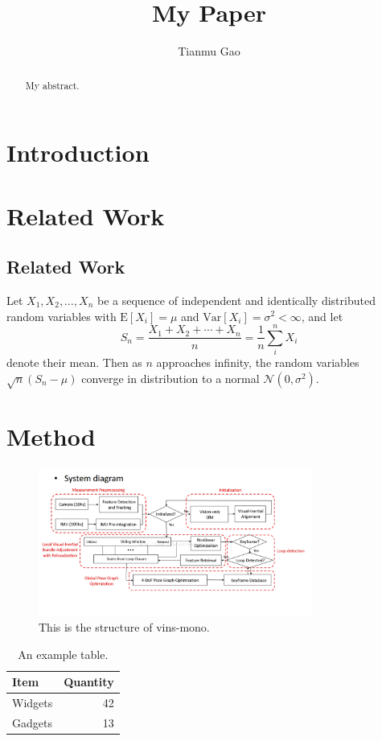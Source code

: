 \documentclass{article}
\title{My Paper}
\author{Tianmu Gao}
\begin{document}
\maketitle

\begin{abstract}
My abstract.
\end{abstract}

\section{Introduction}


\section{Related Work}
\subsection{Related Work}
Let $X_1, X_2, \ldots, X_n$ be a sequence of independent and identically distributed random variables with $\text{E}[X_i] = \mu$ and $\text{Var}[X_i] = \sigma^2 < \infty$\cite{1}, and let
\[S_n = \frac{X_1 + X_2 + \cdots + X_n}{n}
      = \frac{1}{n}\sum_{i}^{n} X_i\]
denote their mean. Then as $n$ approaches infinity, the random variables $\sqrt{n}(S_n - \mu)$ converge in distribution to a normal $\mathcal{N}(0, \sigma^2)$.

\section{Method}


\begin{figure}[ht]
\centering
\includegraphics[width=0.8\textwidth]{vins.jpg}
\caption{\label{fig:vins}This is the structure of vins-mono.}
\end{figure}


\begin{table}[h]
\centering
\begin{tabular}{l|r}
Item & Quantity \\\hline
Widgets & 42 \\
Gadgets & 13
\end{tabular}
\caption{\label{tab:widgets}An example table.}
\end{table}
\end{document}
